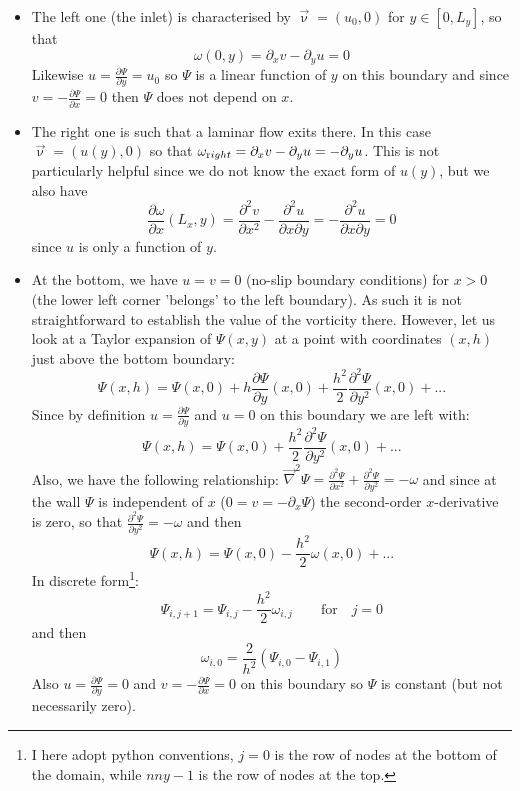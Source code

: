 \begin{itemize}

\item The left one (the inlet) is characterised by $\vec\upnu=(u_0,0)$ for $y\in[0,L_y]$, so that 
\begin{equation}
\omega(0,y) = \partial_x v-\partial_y u = 0
\label{eq:omega1}
\end{equation}
Likewise $u=\frac{\partial \Psi}{\partial y}=u_0$ so $\Psi$ is a linear function of $y$ on this boundary and since $v=-\frac{\partial \Psi}{\partial x}=0$ then $\Psi$ does not depend on $x$. 

\item The right one is such that a laminar flow exits there. In this case $\vec\upnu=(u(y),0)$ so that
$\omega_{\text right} = \partial_x v-\partial_y u = -\partial_y u $. This is not particularly helpful since we do not know the exact form of $u(y)$, but we also have 
\begin{equation}
\frac{\partial \omega }{\partial x}(L_x,y) =
\frac{\partial^2 v}{\partial x^2}
-\frac{\partial^2 u}{\partial x\partial y}
= -\frac{\partial^2 u}{\partial x\partial y} =0
\label{eq:omega2}
\end{equation}
since $u$ is only a function of $y$.

\item At the bottom, we have $u=v=0$ (no-slip boundary conditions) for $x>0$ (the lower left corner 'belongs' to the left boundary).
As such it is not straightforward to establish the value of the vorticity there. 
However, let us look at a Taylor expansion of $\Psi(x,y)$ at a point with coordinates $(x,h)$ just above 
the bottom boundary:
\[
\Psi(x,h) = \Psi(x,0) + h \frac{\partial \Psi}{\partial y}(x,0)  
+ \frac{h^2}{2}  \frac{\partial^2 \Psi}{\partial y^2} (x,0) + ...
\]
Since by definition $u=\frac{\partial \Psi}{\partial y}$ and $u=0$ on this boundary we are left with:
\[
\Psi(x,h) = \Psi(x,0) + \frac{h^2}{2}  \frac{\partial^2 \Psi}{\partial y^2}(x,0) + ...
\]
Also, we have the following relationship:
$
\vec\nabla^2 \Psi=
\frac{\partial^2 \Psi}{\partial x^2 }
+\frac{\partial^2 \Psi}{\partial y^2 } = -\omega
$ and since at the wall $\Psi$ is independent of $x$ ($0=v=-\partial_x \Psi$) the second-order $x$-derivative is zero, so that $\frac{\partial^2 \Psi}{\partial y^2 } = -\omega$ and then
\[
\Psi(x,h) = \Psi(x,0) - \frac{h^2}{2}  \omega(x,0) + ...
\]
In discrete form\footnote{I here adopt python conventions, $j=0$ is the row of nodes at the 
bottom of the domain, while $nny-1$ is the row of nodes at the top.}:
\[
\Psi_{i,j+1} = \Psi_{i,j} - \frac{h^2}{2} \omega_{i,j} \qquad \text{for} \quad  j=0
\]
and then
\begin{equation}
\omega_{i,0} = \frac{2}{h^2} (\Psi_{i,0} -\Psi_{i,1} )  
\label{eq:omega3}
\end{equation}
Also $u=\frac{\partial \Psi}{\partial y}=0$ and $v=-\frac{\partial \Psi}{\partial x}=0$ on this boundary so $\Psi$ is constant (but not necessarily zero). 




\end{itemize}
